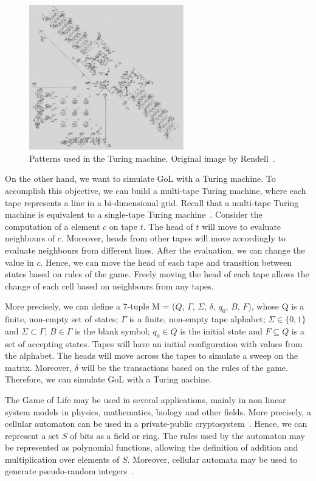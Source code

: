 \documentclass[12pt]{article}
\begin{document}
\begin{figure}[h]
    \centering
    \includegraphics[width=0.6\textwidth]{images/gol-tm.pdf}
    \caption{Patterns used in the Turing machine. Original image by
        Rendell~\cite{Rendell:inproc:2011:jul}.}
    \label{fig:gol_mt}
\end{figure}

On the other hand, we want to simulate GoL with a Turing machine. To accomplish
this objective, we can build a multi-tape Turing machine, where each tape
represents a line in a bi-dimensional grid. Recall that a multi-tape Turing
machine is equivalent to a single-tape Turing machine~\cite[Theorem
3.13]{Sipser:book:2012}. Consider the computation of a element $c$ on tape $t$.
The head of $t$ will move to evaluate neighbours of $c$. Moreover, heads from
other tapes will move accordingly to evaluate neighbours from different lines.
After the evaluation, we can change the value in $c$. Hence, we can move the
head of each tape and transition between states based on rules of the game.
Freely moving the head of each tape allows the change of each cell based on
neighbours from any tapes.

More precisely, we can define a 7-tuple M = ($Q$, $\Gamma$, $\Sigma$, $\delta$,
$q_0$, $B$, $F$), whose Q is a finite, non-empty set of states; $\Gamma$ is a
finite, non-empty tape alphabet; $\Sigma \in \{0, 1\}$ and $\Sigma \subset
\Gamma$; $B \in \Gamma$ is the blank symbol; $q_0 \in Q$ is the initial state
and $F \subseteq Q$ is a set of accepting states. Tapes will have an initial
configuration with values from the alphabet. The heads will move across the
tapes to simulate a sweep on the matrix. Moreover, $\delta$ will be the
transactions based on the rules of the game. Therefore, we can simulate GoL
with a Turing nachine.

The Game of Life may be used in several applications, mainly in non linear
system models in physics, mathematics, biology and other fields. More
precisely, a cellular automaton can be used in a private-public
cryptosystem~\cite{Guan:article:1987:feb}. Hence, we can represent a set $S$ of
bits as a field or ring. The rules used by the automaton may be represented as
polynomial functions, allowing the definition of addition and multiplication
over elements of $S$. Moreover, cellular automata may be used to generate
pseudo-random integers~\cite{Wolfram:article:1986:jun}.
\end{document}
